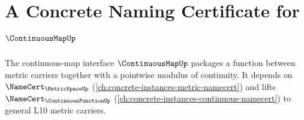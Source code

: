 \chapter{A Concrete Naming Certificate for $\ContinuousMapUp$}
\label{ch:concrete-instances-continuousmap-namecert}

The continuous-map interface $\ContinuousMapUp$ packages a function between
metric carriers together with a pointwise modulus of continuity. It depends on
$\NameCert_{\MetricSpaceUp}$ (\autoref{ch:concrete-instances-metric-namecert})
and lifts $\NameCert_{\ContinuousFunctionUp}$
(\autoref{ch:concrete-instances-continuous-namecert}) to general L10 metric
carriers.









